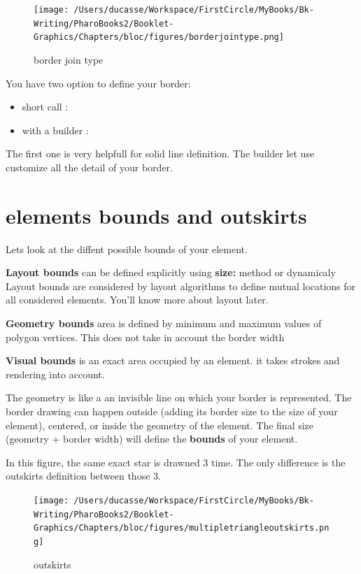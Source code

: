 \documentclass[10pt,twoside,english]{_support/latex/sbabook/sbabook}
\begin{document}
\begin{figure}[htpb]
\begin{center}
\texttt{[image: /Users/ducasse/Workspace/FirstCircle/MyBooks/Bk-Writing/PharoBooks2/Booklet-Graphics/Chapters/bloc/figures/borderjointype.png]}
\caption{border join type}
\end{center}
\end{figure}


You have two option to define your border:

\begin{itemize}
    \item short call : 
    \item with a builder :
\end{itemize}

The first one is very helpfull for solid line definition. The builder let use
customize all the detail of your border.

\section{elements bounds and outskirts}
Lets look at the diffent possible bounds of your element.

\textbf{Layout bounds} can be defined explicitly using \textbf{size:} method or dynamicaly
Layout bounds are considered by layout algorithms to define mutual locations
for all considered elements. You'll know more about layout later.

\textbf{Geometry bounds} area is defined by minimum and maximum values of polygon
vertices. This does not take in account the border width

\textbf{Visual bounds} is an exact area occupied by an element. it takes strokes
and rendering into account.

The geometry is like a an invisible line on which your border is represented.
The border drawing can happen outside (adding its border size to the size of
your element), centered, or inside the geometry of the element. The final size
(geometry + border width) will define the \textbf{bounds} of your element.

In this figure, the same exact star is drawned 3 time. The only difference is
the outskirts definition between those 3.

\begin{figure}[htpb]
\begin{center}
\texttt{[image: /Users/ducasse/Workspace/FirstCircle/MyBooks/Bk-Writing/PharoBooks2/Booklet-Graphics/Chapters/bloc/figures/multipletriangleoutskirts.png]}
\caption{outskirts}
\end{center}
\end{figure}
\end{document}

